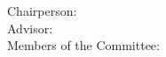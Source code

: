 \begin{titlepage}
\begin{center}
\begin{minipage}[t]{.75\textwidth}
  \begin{center}
    {\large Chairperson:\:}
    {\Chairperson}\\
    {\large Advisor:\:}
    {\Advisor}\\
    {\large Members of the Committee:\:}\\
    {\CommitteeMembers}
  \end{center}
\end{minipage}\\[1.0cm]

{\Large \textbf{\Month\:\Year}}\\
\end{center}
\end{titlepage}
